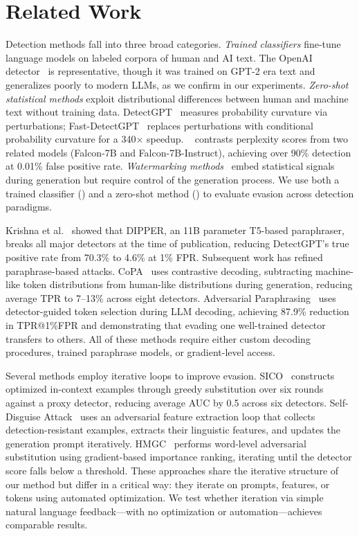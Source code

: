 \section{Related Work}
\label{sec:related_work}

Detection methods fall into three broad categories.
\emph{Trained classifiers} fine-tune language models on labeled corpora of human and AI text. The OpenAI \roberta detector~\cite{solaiman2019release} is representative, though it was trained on GPT-2 era text and generalizes poorly to modern LLMs, as we confirm in our experiments.
\emph{Zero-shot statistical methods} exploit distributional differences between human and machine text without training data.
DetectGPT~\cite{mitchell2023detectgpt} measures probability curvature via perturbations; Fast-DetectGPT~\cite{bao2024fast} replaces perturbations with conditional probability curvature for a 340$\times$ speedup.
\binoculars~\cite{hans2024binoculars} contrasts perplexity scores from two related models (\eg Falcon-7B and Falcon-7B-Instruct), achieving over 90\% detection at 0.01\% false positive rate.
\emph{Watermarking methods}~\cite{kirchenbauer2023watermark} embed statistical signals during generation but require control of the generation process.
We use both a trained classifier (\roberta) and a zero-shot method (\binoculars) to evaluate evasion across detection paradigms.

Krishna et al.~\cite{krishna2023paraphrasing} showed that DIPPER, an 11B parameter T5-based paraphraser, breaks all major detectors at the time of publication, reducing DetectGPT's true positive rate from 70.3\% to 4.6\% at 1\% FPR.
Subsequent work has refined paraphrase-based attacks.
CoPA~\cite{fang2025copa} uses contrastive decoding, subtracting machine-like token distributions from human-like distributions during generation, reducing average TPR to 7--13\% across eight detectors.
Adversarial Paraphrasing~\cite{cheng2025adversarial} uses detector-guided token selection during LLM decoding, achieving 87.9\% reduction in TPR@1\%FPR and demonstrating that evading one well-trained detector transfers to others.
All of these methods require either custom decoding procedures, trained paraphrase models, or gradient-level access.

Several methods employ iterative loops to improve evasion.
SICO~\cite{lu2024sico} constructs optimized in-context examples through greedy substitution over six rounds against a proxy detector, reducing average AUC by 0.5 across six detectors.
Self-Disguise Attack~\cite{zhou2025sda} uses an adversarial feature extraction loop that collects detection-resistant examples, extracts their linguistic features, and updates the generation prompt iteratively.
HMGC~\cite{zhou2024hmgc} performs word-level adversarial substitution using gradient-based importance ranking, iterating until the detector score falls below a threshold.
These approaches share the iterative structure of our method but differ in a critical way: they iterate on prompts, features, or tokens using automated optimization. We test whether iteration via simple natural language feedback---with no optimization or automation---achieves comparable results.

